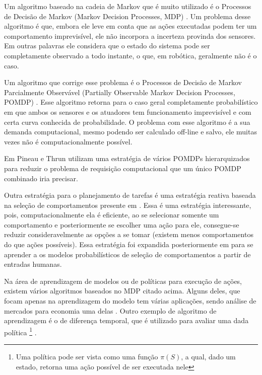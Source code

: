 Um algoritmo baseado na cadeia de Markov que é muito utilizado é o Processos de Decisão de Markov (Markov Decision Processes, MDP) \cite{Thrun:2005:PR:1121596}. Um problema desse algoritmo é que, embora ele leve em conta que as ações executadas podem ter um comportamento imprevisível, ele não incorpora a incerteza provinda dos sensores. Em outras palavras ele considera que o estado do sistema pode ser completamente observado a todo instante, o que, em robótica, geralmente não é o caso.

Um algoritmo que corrige esse problema é o Processos de Decisão de Markov Parcialmente Observável (Partially Observable Markov Decision Processes, POMDP) \cite{Thrun:2005:PR:1121596}. Esse algoritmo retorna para o caso geral completamente probabilístico em que ambos os sensores e os atuadores tem funcionamento imprevisível e com certa curva conhecida de probabilidade. O problema com esse algoritmo é a sua demanda computacional, mesmo podendo ser calculado off-line e salvo, ele muitas vezes não é computacionalmente possível.

Em \cite{Pineau01hierarchicalpomdp} Pineau e Thrun utilizam uma estratégia de vários POMDPs hierarquizados para reduzir o problema de requisição computacional que um único POMDP combinado iria precisar.

Outra estratégia para o planejamento de tarefas é uma estratégia reativa baseada na seleção de comportamentos presente em \cite{Koike:2005,lidoris2008}. Essa é uma estratégia interessante, pois, computacionalmente ela é eficiente, ao se selecionar somente um comportamento e posteriormente se escolher uma ação para ele, consegue-se reduzir consideravelmente as opções a se tomar (existem menos comportamentos do que ações possíveis). Essa estratégia foi expandida posteriormente em \cite{lidoris2011state} para se aprender a os modelos probabilísticos de seleção de comportamentos a partir de entradas humanas.

Na área de aprendizagem de modelos ou de políticas para execução de ações, existem vários algoritmos baseados no MDP citado acima. Alguns deles, que focam apenas na aprendizagem do modelo \cite{calvet:hal-00674226,Gutmann_noise-contrastiveestimation} tem várias aplicações, sendo análise de mercados para economia uma delas \cite{calvet:hal-00674226}. Outro exemplo de algoritmo de aprendizagem é o de diferença temporal, que é utilizado para avaliar uma dada política%
\footnote{Uma política pode ser vista como uma função $ \pi \left( S \right) $, a qual, dado um estado, retorna uma ação possível de ser executada nele%
}
\cite{Sutton:1988:LPM,Andreas:2007,sutton1998reinforcement}.

